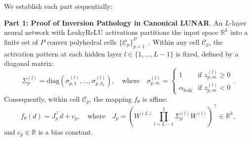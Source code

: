 \begin{IEEEproof}
We establish each part sequentially:

\textbf{Part 1: Proof of Inversion Pathology in Canonical LUNAR}.
An $L$-layer neural network with LeakyReLU activations partitions the input space $\mathbb{R}^k$ into a finite set of $P$ convex polyhedral cells $\{\mathcal{C}_p\}_{p=1}^P$~\cite{arora2018understanding}. Within any cell $\mathcal{C}_p$, the activation pattern at each hidden layer $l \in \{1, \dots, L-1\}$ is fixed, defined by a diagonal matrix:
\begin{equation}
\Sigma_p^{(l)} = \text{diag}\left(\sigma_{p,1}^{(l)}, \dots, \sigma_{p,h_l}^{(l)}\right), \quad \text{where} \quad \sigma_{p,m}^{(l)} = \begin{cases} 1 & \text{if } z_{p,m}^{(l)} \ge 0 \\ \alpha_{\text{leak}} & \text{if } z_{p,m}^{(l)} < 0 \end{cases}.
\end{equation}
Consequently, within cell $\mathcal{C}_p$, the mapping $f_\theta$ is affine:
\begin{equation}
f_\theta(d) = J_p^\top d + c_p, \quad \text{where} \quad J_p = \left( W^{(L)} \prod_{l=L-1}^1 \Sigma_p^{(l)} W^{(l)} \right)^\top \in \mathbb{R}^k,
\end{equation}
and $c_p \in \mathbb{R}$ is a bias constant.


\end{IEEEproof}

